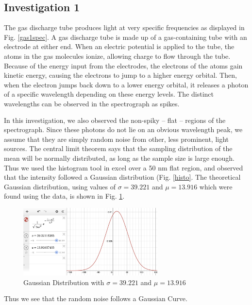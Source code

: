 \documentclass{article}[12pt]
\renewcommand{\figurename}{Fig. }
\begin{document}
\subsection{Investigation 1}

The gas discharge tube produces light at very specific frequencies as displayed in \figurename \ref{gas1spec}.
A gas discharge tube is made up of a gas-containing tube with an electrode at either end.
When an electric potential is applied to the tube, the atoms in the gas molecules ionize, allowing charge to flow through the tube.
Because of the energy input from the electrodes, the electrons of the atoms gain kinetic energy, causing the electrons to jump to a higher energy orbital.
Then, when the electron jumps back down to a lower energy orbital, it releases a photon of a specific wavelength depending on these energy levels.
The distinct wavelengths can be observed in the spectrograph as spikes.

In this investigation, we also observed the non-spiky -- flat -- regions of the spectrograph.
Since these photons do not lie on an obvious wavelength peak, we assume that they are simply random noise from other, less prominent, light sources.
The central limit theorem says that the sampling distribution of the mean will be normally distributed, as long as the sample size is large enough.
Thus we used the histogram tool in excel over a 50 nm flat region, and observed that the intensity followed a Gaussian distribution (\figurename \ref{histo}.
The theoretical Gaussian distribution, using values of $ \sigma = 39.221$ and $ \mu = 13.916 $ which were found using the data, is shown in \figurename \ref{gauss}.

\begin{figure} [H]
  \center
  \includegraphics[width=0.65\textwidth]{figures/gaussian.png}
  \caption{Gaussian Distribution with $ \sigma = 39.221$ and $ \mu = 13.916 $}
  \label{gauss}
\end{figure}

Thus we see that the random noise follows a Gaussian Curve.
\end{document}
